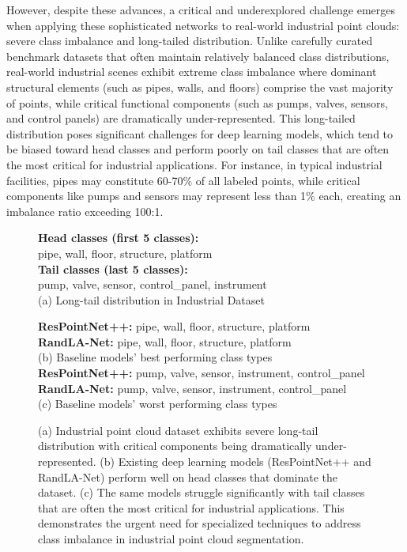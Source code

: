 \documentclass[preprint,12pt]{elsarticle}
\begin{document}
However, despite these advances, a critical and underexplored challenge emerges when applying these sophisticated networks to real-world industrial point clouds: severe class imbalance and long-tailed distribution. Unlike carefully curated benchmark datasets that often maintain relatively balanced class distributions, real-world industrial scenes exhibit extreme class imbalance where dominant structural elements (such as pipes, walls, and floors) comprise the vast majority of points, while critical functional components (such as pumps, valves, sensors, and control panels) are dramatically under-represented. This long-tailed distribution poses significant challenges for deep learning models, which tend to be biased toward head classes and perform poorly on tail classes that are often the most critical for industrial applications. For instance, in typical industrial facilities, pipes may constitute 60-70\% of all labeled points, while critical components like pumps and sensors may represent less than 1\% each, creating an imbalance ratio exceeding 100:1.

\begin{figure}[htbp]
    \centering
    \begin{minipage}{0.48\textwidth}
        \centering
        \textbf{Head classes (first 5 classes):}\\
        pipe, wall, floor, structure, platform\\[1ex]
        \textbf{Tail classes (last 5 classes):}\\
        pump, valve, sensor, control\_panel, instrument\\
        (a) Long-tail distribution in Industrial Dataset
    \end{minipage}
    \hfill
    \begin{minipage}{0.48\textwidth}
        \centering
        \textbf{ResPointNet++:} pipe, wall, floor, structure, platform\\
        \textbf{RandLA-Net:} pipe, wall, floor, structure, platform\\
        (b) Baseline models' best performing class types\\[1ex]
        \textbf{ResPointNet++:} pump, valve, sensor, instrument, control\_panel\\
        \textbf{RandLA-Net:} pump, valve, sensor, instrument, control\_panel\\
        (c) Baseline models' worst performing class types
    \end{minipage}
    \caption{(a) Industrial point cloud dataset exhibits severe long-tail distribution with critical components being dramatically under-represented. (b) Existing deep learning models (ResPointNet++ and RandLA-Net) perform well on head classes that dominate the dataset. (c) The same models struggle significantly with tail classes that are often the most critical for industrial applications. This demonstrates the urgent need for specialized techniques to address class imbalance in industrial point cloud segmentation.}
    \label{fig:longtail}
\end{figure}
\end{document}
